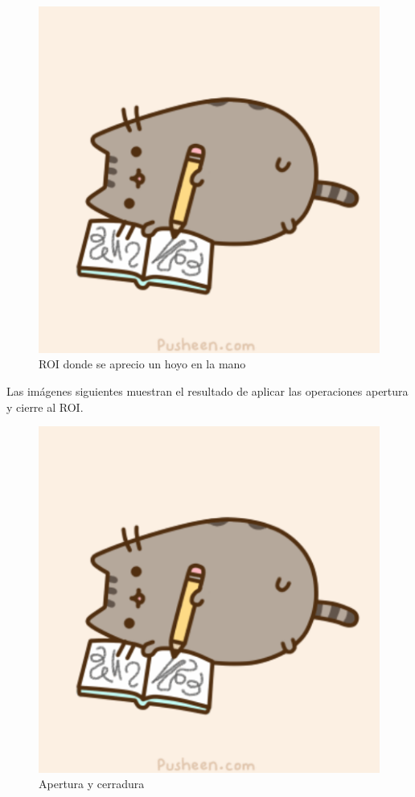 \begin{figure}[h!]
\begin{center}
\includegraphics[scale=.5]{./Figures/pusheen.png}
\end{center}
\caption{ROI donde se aprecio un hoyo en la mano}
\label{fig:RuidoHoyo}
\end{figure}  
Las imágenes siguientes muestran el resultado de aplicar las operaciones apertura y cierre al ROI. 
\begin{figure}[h!]
\begin{center}
\includegraphics[scale=.5]{./Figures/pusheen.png}
\end{center}
\caption{Apertura y cerradura}
\label{fig:ImagenOpenClose}
\end{figure}  

